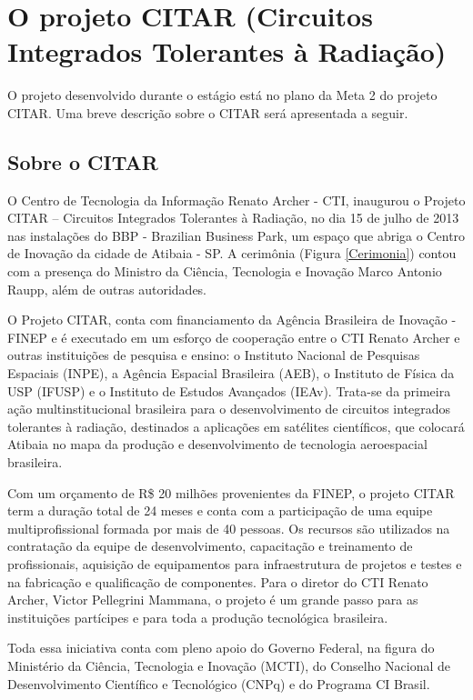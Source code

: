 \documentclass[
	12pt,				%
	openright,			%
	twoside,			%
	a4paper,			%
	english,			%
	french,				%
	spanish,			%
	brazil				%
	]{abntex2}
\begin{document}
\chapter{O projeto CITAR (Circuitos Integrados Tolerantes à Radiação)}
O projeto desenvolvido durante o estágio está no plano da Meta 2 do projeto CITAR. Uma breve descrição sobre o CITAR será apresentada a seguir.

\section{Sobre o CITAR}
O Centro de Tecnologia da Informação Renato Archer - CTI, inaugurou o Projeto CITAR – Circuitos Integrados Tolerantes à Radiação, no dia 15 de julho de 2013 nas instalações do BBP - Brazilian Business Park, um espaço que abriga o Centro de Inovação da cidade de Atibaia - SP. A cerimônia (Figura \ref{Cerimonia}) contou com a presença do Ministro da Ciência, Tecnologia e Inovação Marco Antonio Raupp, além de outras autoridades.

O Projeto CITAR, conta com financiamento da Agência Brasileira de Inovação - FINEP e é executado em um esforço de cooperação entre o CTI Renato Archer e outras instituições de pesquisa e ensino: o Instituto Nacional de Pesquisas Espaciais (INPE), a Agência Espacial Brasileira (AEB), o Instituto de Física da USP (IFUSP) e o Instituto de Estudos Avançados (IEAv).
Trata-se da primeira ação multinstitucional brasileira para o desenvolvimento de circuitos integrados tolerantes à radiação, destinados a aplicações em satélites científicos, que colocará Atibaia no mapa da produção e desenvolvimento de tecnologia aeroespacial brasileira.

Com um orçamento de R\$ 20 milhões provenientes da FINEP, o projeto CITAR term a duração total de 24 meses e conta com a participação de uma equipe multiprofissional formada por mais de 40 pessoas. Os recursos são utilizados na contratação da equipe de desenvolvimento, capacitação e treinamento de profissionais, aquisição de equipamentos para infraestrutura de projetos e testes e na fabricação e qualificação de componentes. Para o diretor do CTI Renato Archer, Victor Pellegrini Mammana, o projeto é um grande passo para as instituições partícipes e para toda a produção tecnológica brasileira.

Toda essa iniciativa conta com pleno apoio do Governo Federal, na figura do Ministério da Ciência, Tecnologia e Inovação (MCTI), do Conselho Nacional de Desenvolvimento Científico e Tecnológico (CNPq) e do Programa CI Brasil.
\end{document}
